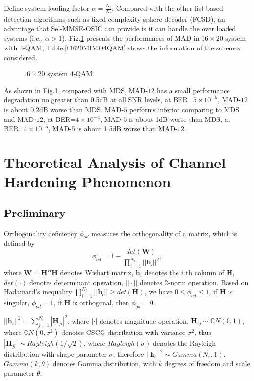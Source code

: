 \documentclass[12pt, draftclsnofoot, onecolumn]{IEEEtran}
\begin{document}
Define system loading factor $\alpha=\frac{N_{t}}{N_{r}}$. Compared with the other list based detection algorithms such as fixed complexity sphere decoder (FCSD), an advantage that Sel-MMSE-OSIC can provide is it can handle the over loaded systems (i.e., $\alpha>1$). Fig.\ref{f1620MIMO4QAM} presents the performances of MAD in $16\times 20$ system with $4$-QAM, Table.\ref{t1620MIMO4QAM} shows the information of the schemes considered.

\begin{figure}
\centering
\def\svgwidth{\columnwidth}

\caption{$16\times 20$ system $4$-QAM}
\label{f1620MIMO4QAM}
\end{figure}
As shown in Fig.\ref{f1620MIMO4QAM}, compared with MDS, MAD-$12$ has a small performance degradation no greater than 0.5dB at all SNR levels, at BER=$5\times 10^{-5}$, MAD-$12$ is about 0.2dB worse than MDS. MAD-$5$ performs inferior comparing to MDS and MAD-$12$, at BER=$4\times 10^{-4}$, MAD-$5$ is about 1dB worse than MDS, at BER=$4\times 10^{-5}$, MAD-$5$ is about 1.5dB worse than MAD-$12$.
\newpage
\section{Theoretical Analysis of Channel Hardening Phenomenon}
\subsection{Preliminary}
Orthogonality deficiency $\phi_{od}$ measures the orthogonality of a matrix\cite{ma2008performance}, which is defined by
\begin{equation}
\phi_{od}=1-\frac{det(\mathbf{W})}{\prod_{i=1}^{N_{t}}||\mathbf{h}_{i}||^{2}},
\label{OD}
\end{equation}
where $\mathbf{W}=\mathbf{H}^{H}\mathbf{H}$ denotes Wishart matrix, $\mathbf{h}_{i}$ denotes the $i$ th column of $\mathbf{H}$, $det(\cdot)$ denotes determinant operation, $||\cdot||$ denotes 2-norm operation. Based on Hadamard's inequality $\prod_{i=1}^{N_{t}}||\mathbf{h}_{i}||\geq det(\mathbf{H})$, we have $0\leq\phi_{od}\leq 1$, if $\mathbf{H}$ is singular, $\phi_{od}=1$, if $\mathbf{H}$ is orthogonal, then $\phi_{od}=0$.

$||\mathbf{h}_{i}||^{2}=\sum_{j=1}^{N_{r}}|\mathbf{H}_{ji}|^{2}$, where $|\cdot|$ denotes magnitude operation. $\mathbf{H}_{ij}\sim \mathbb{C}N(0,1)$, where $\mathbb{C}N(0, \sigma^{2})$ denotes CSCG distribution with variance $\sigma^{2}$, thus $|\mathbf{H}_{ji}|\sim Rayleigh(1/\sqrt{2})$, where $Rayleigh(\sigma)$ denotes the Rayleigh distribution with shape parameter $\sigma$, therefore $||\mathbf{h}_{i}||^{2}\sim Gamma(N_{r},1)$\cite{papoulis2002probability}. $Gamma(k,\theta)$ denotes Gamma distribution, with $k$ degrees of freedom and scale parameter $\theta$.
\end{document}
